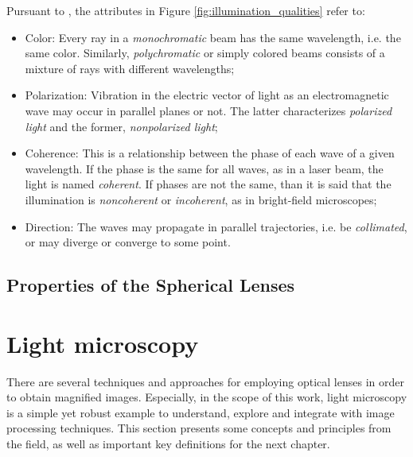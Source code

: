 Pursuant to , the attributes in Figure \ref{fig:illumination_qualities} 
refer to:

\begin{itemize}
    \item Color: Every ray in a \emph{monochromatic} beam has the same wavelength, i.e. the same color. Similarly, \emph{polychromatic} or simply colored beams consists of a mixture of rays with different wavelengths;
    
    \item Polarization: Vibration in the electric vector of light as an electromagnetic wave may occur
    in parallel planes or not. The latter characterizes \emph{polarized light} and the former, \emph{nonpolarized light};
    
    \item Coherence: This is a relationship between the phase of each wave of a given wavelength. If the phase is the same for all waves, as in a laser beam, the light is named \emph{coherent}. If phases are not the same, than it is said that the illumination is \emph{noncoherent} or \emph{incoherent}, as in bright-field microscopes;
    
    \item Direction: The waves may propagate in parallel trajectories, i.e. be \emph{collimated}, or may diverge or converge to some point.
    
\end{itemize}

\subsection{Properties of the Spherical Lenses}



\section{Light microscopy}
\label{sec:light_microscopy}

There are several techniques and approaches for employing optical lenses in order to obtain magnified images. Especially, in the scope of this work, light microscopy is a simple yet robust example to understand, explore and integrate with image processing techniques. This section presents some concepts and principles from the field, as well as important key definitions for the next chapter.

